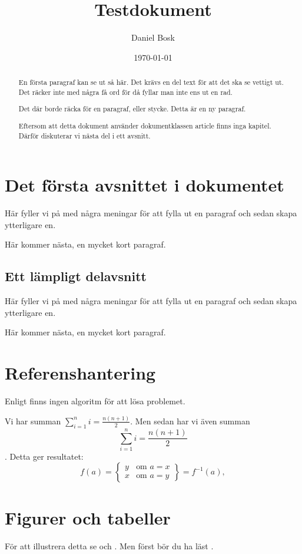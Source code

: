 \documentclass[a4paper]{article}
\author{Daniel Bosk}
\title{Testdokument}
\date{\today}
\begin{document}
	\maketitle

	\begin{abstract}
    En första paragraf kan se ut så här.
		Det krävs en del text för att det ska se vettigt ut.
		Det räcker inte med några få ord för då fyllar man inte ens ut en rad.

		Det där borde räcka för en paragraf, eller stycke.
		Detta är en ny paragraf.

		Eftersom att detta dokument använder dokumentklassen article finns inga 
		kapitel.
		Därför diskuterar vi nästa del i ett avsnitt.
	\end{abstract}

	\tableofcontents

	\section[Första avsnittet]{Det första avsnittet i dokumentet}
	\label{sec:First}
  Här fyller vi på med några meningar för att fylla ut en paragraf och sedan 
  skapa ytterligare en.

	Här kommer nästa, en mycket kort paragraf.

	\subsection[Delavsnittet]{Ett lämpligt delavsnitt}
	\label{sub:Del}
  Här fyller vi på med några meningar för att fylla ut en paragraf och sedan 
  skapa ytterligare en.

	Här kommer nästa, en mycket kort paragraf.


	\section{Referenshantering}
	\label{sec:Ref}
  Enligt \citet{Knuth1997tao} finns ingen algoritm för att lösa problemet.

	Vi har summan \( \sum_{i=1}^n i = \frac{n (n + 1)}{2} \).
	Men sedan har vi även summan \[ \sum_{i=1}^n i = \frac{n (n + 1)}{2} \].
	Detta ger resultatet:
	\[ f(a) = \left\{
		\begin{array}{ll}
			y & \text{om } a=x \\
			x & \text{om } a=y
		\end{array}
		\right\} = f^{-1}(a), \]


	\section{Figurer och tabeller}
	\label{sec:FigTab}
  För att illustrera detta se  och 
  .
	Men först bör du ha läst .
\end{document}
